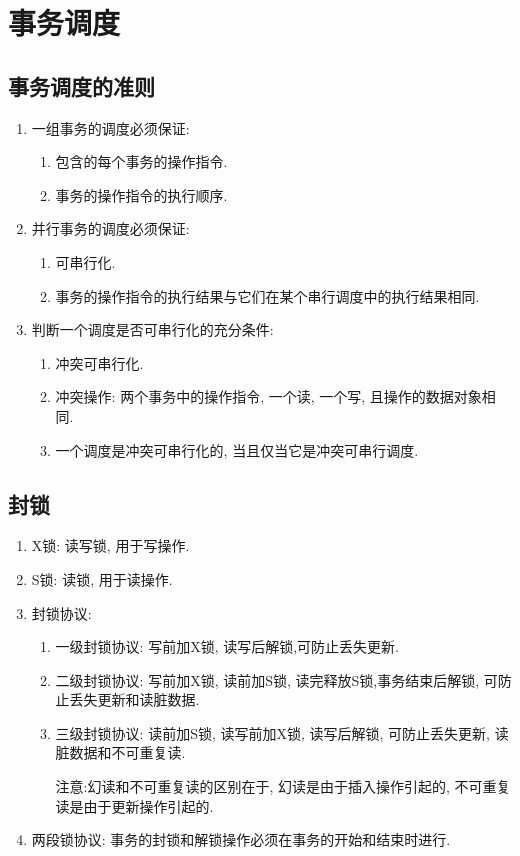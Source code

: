 \section{事务调度}
\subsection{事务调度的准则}
\begin{enumerate}[label=(\arabic*)]
    \item 一组事务的调度必须保证:
    \begin{enumerate}[label=\alph*.]
        \item 包含的每个事务的操作指令.
        \item 事务的操作指令的执行顺序.
    \end{enumerate}
    \item 并行事务的调度必须保证:
    \begin{enumerate}[label=\alph*.]
        \item 可串行化.
        \item 事务的操作指令的执行结果与它们在某个串行调度中的执行结果相同.
    \end{enumerate}
    \item 判断一个调度是否可串行化的充分条件:
    \begin{enumerate}[label=\alph*.]
        \item 冲突可串行化.
        \item 冲突操作: 两个事务中的操作指令, 一个读, 一个写, 且操作的数据对象相同.
        \item 一个调度是冲突可串行化的, 当且仅当它是冲突可串行调度.
    \end{enumerate}
\end{enumerate}
\subsection{封锁}
\begin{enumerate}[label=(\arabic*)]
    \item X锁: 读写锁, 用于写操作.
    \item S锁: 读锁, 用于读操作.
    \item 封锁协议:
    \begin{enumerate}[label=\alph*.]
        \item 一级封锁协议: 写前加X锁, 读写后解锁,可防止丢失更新.
        \item 二级封锁协议: 写前加X锁, 读前加S锁, 读完释放S锁,事务结束后解锁, 可防止丢失更新和读脏数据.
        \item 三级封锁协议: 读前加S锁, 读写前加X锁, 读写后解锁, 可防止丢失更新, 读脏数据和不可重复读.
        \par 注意:幻读和不可重复读的区别在于, 幻读是由于插入操作引起的, 不可重复读是由于更新操作引起的.
    \end{enumerate}
    \item 两段锁协议: 事务的封锁和解锁操作必须在事务的开始和结束时进行.
\end{enumerate}
